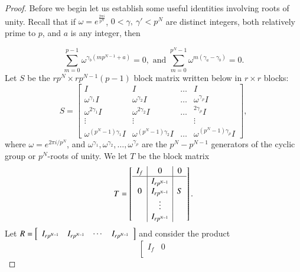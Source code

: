 \documentclass[preprint,12pt]{elsarticle}
\theoremstyle{definition}
\theoremstyle{remark}
\begin{document}
\begin{proof}
Before we begin let us establish some useful identities  involving roots of unity. Recall that if $\omega = e^{\frac{2\pi i }{p^N}}$, $0< \gamma, \ \gamma' < p^N$ are distinct integers, both relatively prime to $p$, and $a$ is any integer,  then 

\begin{equation}\label{eq:rtsofunity}
\sum\limits_{m=0}^{p-1}\omega^{\gamma_b (m p^{N-1}+a)}=0, \text{ and } \sum\limits_{m=0}^{p^{N}-1}\omega^{m(\gamma_a-\gamma_b)}=0.
\end{equation} 
  Let $S$ be the $rp^N \times rp^{N-1}(p-1)$ block matrix written below in $r \times r$ blocks: 
 \[
S = \left[\begin{array}{llll}
 I & I & \ldots & I \\
 \omega^{\gamma_1} I & \omega^{\gamma_2} I & \ldots & \omega^{\gamma_\rho} I \\
 \omega^{2\gamma_1} I & \omega^{2\gamma_2} I & \ldots & ^{2\gamma_\rho} I \\
\vdots  & \vdots & & \vdots \\
 \omega^{(p^N-1)\gamma_1} I & \omega^{(p^N-1)\gamma_2} I & \ldots & \omega^{(p^N-1)\gamma_\rho} I
 \end{array}\right],
\]
where $\omega = e^{2\pi i /p^N}$, and $\omega^{\gamma_1}, \omega^{\gamma_2}, \ldots, \omega^{\gamma_\rho}$ are  the $p^N - p^{N-1}$ generators of the cyclic group or $p^N$-roots of unity. We let $T$ be the block matrix
\[
T = \left[\begin{array}{c | c | c}
I_f & 0 & 0 \\\hline
 & I_{rp^{N-1}} &  \\
0 & I_{rp^{N-1}} & S \\
&\vdots &  \\
 & I_{rp^{N-1}} &  \\
\end{array}\right].
\]
Let $R=\left[\begin{array}{l l l l}I_{rp^{N-1}}& I_{rp^{N-1}}&\cdots& I_{rp^{N-1}}\end{array}\right]$ and consider the product
\[
 \left[\begin{array}{cc  }
I_f & 0 \\[1mm]

\end{array}\]
\end{proof}
\end{document}
